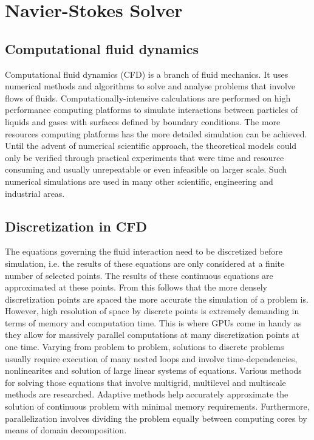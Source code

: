 \chapter{Navier-Stokes Solver}
\section{Computational fluid dynamics}
Computational fluid dynamics (CFD) is a branch of fluid mechanics. It uses numerical methods and algorithms to solve and analyse problems that involve flows of fluids. Computationally-intensive calculations are performed on high performance computing platforms to simulate interactions between particles of liquids and gases with surfaces defined by boundary conditions. The more resources computing platforms has the more detailed simulation can be achieved. Until the advent of numerical scientific approach, the theoretical models could only be verified through practical experiments that were time and resource consuming and usually unrepeatable or even infeasible on larger scale. Such numerical simulations are used in many other scientific, engineering and industrial areas.

\section{Discretization in CFD}
The equations governing the fluid interaction need to be discretized before simulation, i.e. the results of these equations are only considered at a finite number of selected points. The results of these continuous equations are approximated at these points. From this follows that the more densely discretization points are spaced the more accurate the simulation of a problem is.  However, high resolution of space by discrete points is extremely demanding in terms of memory and computation time. This is where GPUs come in handy as they allow for massively parallel computations at many discretization points at one time. Varying from problem to problem, solutions to discrete problems usually require execution of many nested loops and involve time-dependencies, nonlinearites and solution of large linear systems of equations. Various methods for solving those equations that involve multigrid, multilevel and multiscale methods are researched. Adaptive methods help accurately approximate the solution of continuous problem with minimal memory requirements. Furthermore, parallelization involves dividing the problem equally between computing cores by means of domain decomposition.

